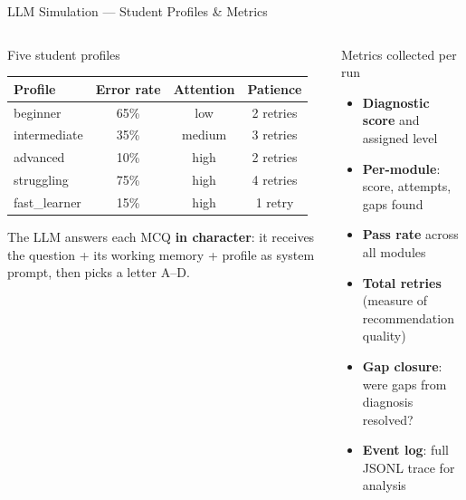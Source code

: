 \documentclass[aspectratio=169,12pt]{beamer}
\begin{document}
\begin{frame}{LLM Simulation — Student Profiles \& Metrics}
  \begin{columns}
      \begin{block}{Five student profiles}
        \begin{center}\scriptsize
        \begin{tabular}{lccc}
          \toprule
          \textbf{Profile} & \textbf{Error rate} & \textbf{Attention} & \textbf{Patience} \\
          \midrule
          beginner     & 65\% & low    & 2 retries \\
          intermediate & 35\% & medium & 3 retries \\
          advanced     & 10\% & high   & 2 retries \\
          struggling   & 75\% & high   & 4 retries \\
          fast\_learner & 15\% & high   & 1 retry   \\
          \bottomrule
        \end{tabular}
        \end{center}
        \vspace{4pt}
        \scriptsize
        The LLM answers each MCQ \textbf{in character}:
        it receives the question + its working memory + profile
        as system prompt, then picks a letter A–D.
      \end{block}
      \begin{block}{Metrics collected per run}
        \begin{itemize}\small
          \item \textbf{Diagnostic score} and assigned level
          \item \textbf{Per-module}: score, attempts, gaps found
          \item \textbf{Pass rate} across all modules
          \item \textbf{Total retries} (measure of recommendation quality)
          \item \textbf{Gap closure}: were gaps from diagnosis resolved?
          \item \textbf{Event log}: full JSONL trace for analysis
        \end{itemize}
      \end{block}
      \vspace{4pt}

\end{columns}
\end{frame}
\end{document}
